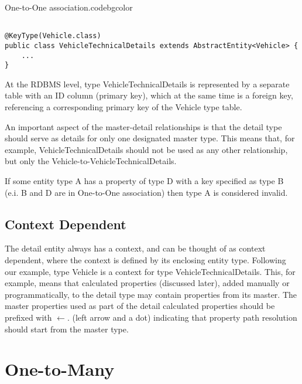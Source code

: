   \begin{code}{One-to-One association.}{\label{lst:One2One}}{codebgcolor}
    \begin{lstlisting}

@KeyType(Vehicle.class)
public class VehicleTechnicalDetails extends AbstractEntity<Vehicle> {
    ...
}
    \end{lstlisting}
  \end{code}

  At the RDBMS level, type VehicleTechnicalDetails is represented by a separate table with an ID column (primary key), which at the same time is a foreign key, referencing a corresponding primary key of the Vehicle type table.

  An important aspect of the master-detail relationships is that the detail type should serve as details for only one designated master type. This means that, for example, VehicleTechnicalDetails should not be used as any other relationship, but only the Vehicle-to-VehicleTechnicalDetails.

  If some entity type A has a property of type D with a key specified as type B (e.i. B and D are in One-to-One association) then type A is considered invalid.

  \subsection{Context Dependent}

  The detail entity always has a context, and can be thought of as context dependent, where the context is defined by its enclosing entity type. Following our example, type Vehicle is a context for type VehicleTechnicalDetails. This, for example, means that calculated properties (discussed later), added manually or programmatically, to the detail type may contain properties from its master. The master properties used as part of the detail calculated properties should be prefixed with $\leftarrow.$ (left arrow and a dot) indicating that property path resolution should start from the master type.

\section{One-to-Many}

